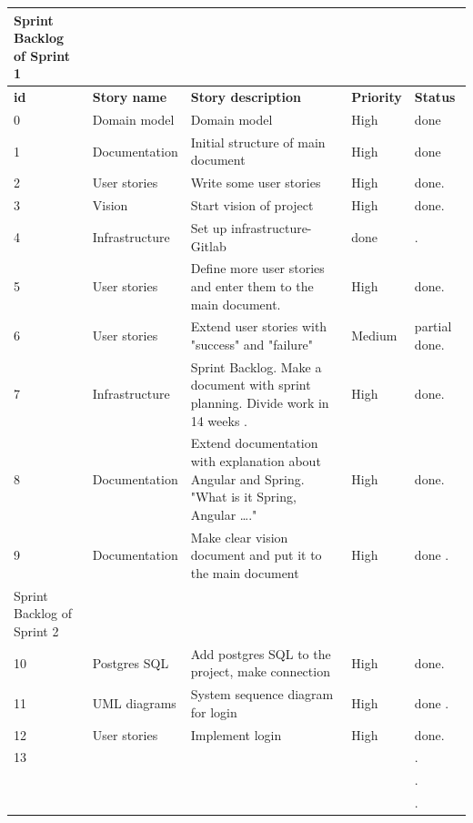 \documentclass{scrartcl}
\begin{document}
\begin{table}[h]
\begin{center}
\begin{tabular}{| p{2.5cm}| p{4cm} | p{5cm} |p{2.5cm} | p{4cm}|}
   Sprint Backlog of Sprint 1\\ \hline
    

          \textbf{id}  &  \textbf{Story name} &  \textbf{Story description} &  \textbf{Priority}  & \textbf{Status}\\ \hline
         0 & Domain model & Domain model & High & done \\ \hline
        1 & Documentation  & Initial structure of main document & High & done \\ \hline
        
           2 &  User stories  & Write some user stories  & High & done. \\ \hline
           3 &  Vision &  Start vision of project & High  & done. \\ \hline
            4 & Infrastructure & Set up infrastructure- Gitlab & done & . \\ \hline
             5 &  User stories & Define more user stories and enter them to the main document. & High & done. \\ \hline
              6 & User stories & Extend user stories with "success" and "failure" & Medium & partial done. \\ \hline
               7 & Infrastructure & Sprint Backlog. Make a document with sprint planning. Divide work in 14 weeks .  & High &  done. \\ \hline
                8 & Documentation & Extend documentation with explanation about Angular and Spring. "What is it Spring, Angular …." & High & done. \\ \hline
                9 & Documentation & Make clear vision document and put it to the main document & High & done . \\ \hline
               
                Sprint Backlog of Sprint 2 \\
                  10 & Postgres SQL & Add postgres SQL to the project, make connection & High & done. \\ \hline
                    11& UML diagrams & System sequence diagram for login & High & done . \\ \hline
                    12 &  User stories &  Implement login & High & done. \\ \hline
                     13 &  &  &  & . \\ \hline
                       &  &  &  & . \\ \hline
                        &  &  &  & . \\ \hline
                    

\end{tabular}
\end{center}
\end{table}
\end{document}
